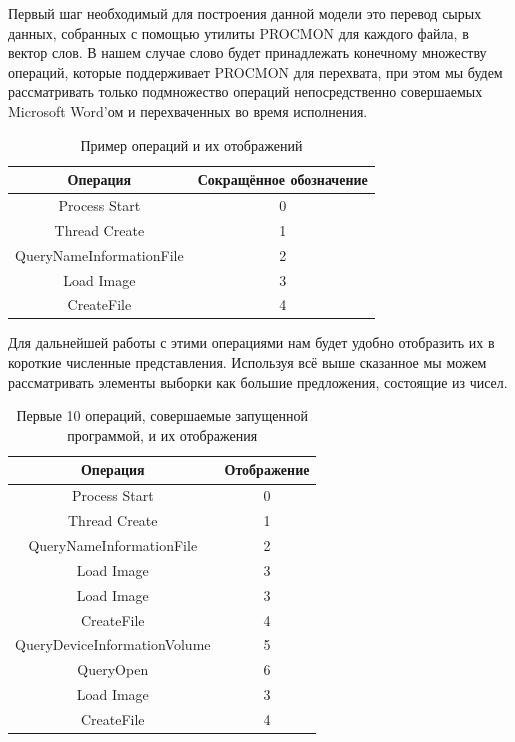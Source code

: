 Первый шаг необходимый для построения данной модели это перевод сырых данных, собранных с помощью утилиты PROCMON для каждого файла, в вектор слов. В нашем случае слово будет принадлежать конечному множеству операций, которые поддерживает PROCMON для перехвата, при этом мы будем рассматривать только подмножество операций непосредственно совершаемых Microsoft Word’ом и перехваченных во время исполнения.

\bgroup
\def\arraystretch{1.5}%
\begin{table}[ht]
\caption{Пример операций и их отображений}
\label{tab_weight}
\centering
    \begin{tabular}{|c|c|}
    \hline \rowcolor{lightgray!50} Операция & Сокращённое обозначение \\
    \hline Process Start &  0 \\
    \hline Thread Create &  1 \\
    \hline QueryNameInformationFile &  2 \\
    \hline Load Image &  3 \\
    \hline CreateFile &  4 \\
    \hline
    \end{tabular}
\end{table}
\egroup

Для дальнейшей работы с этими операциями нам будет удобно отобразить их в короткие численные представления. Используя всё выше сказанное мы можем рассматривать элементы выборки как большие предложения, состоящие из чисел.

\newpage
\bgroup
\def\arraystretch{1.5}%
\begin{table}[ht]
\caption{Первые 10 операций, совершаемые запущенной программой, и их отображения}
\label{tab_weight}
\centering
    \begin{tabular}{|c|c|}
    \hline \rowcolor{lightgray!50} Операция & Отображение \\
    \hline Process Start &  0 \\
    \hline Thread Create &  1 \\
    \hline QueryNameInformationFile &  2 \\
    \hline Load Image &  3 \\
    \hline Load Image &  3 \\
    \hline CreateFile &  4 \\
    \hline QueryDeviceInformationVolume &  5 \\
    \hline QueryOpen &  6 \\
    \hline Load Image &  3 \\
    \hline CreateFile &  4 \\
    \hline
    \end{tabular}
\end{table}
\egroup

